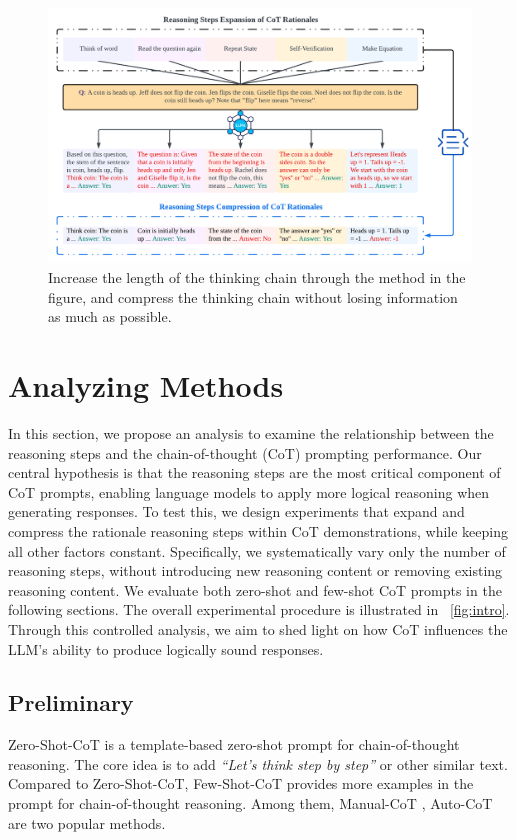 \documentclass[11pt]{article}
\begin{document}
\begin{figure}[ht]
    \centering
    \includegraphics[width=1\linewidth]{intro.pdf}
    \caption{Increase the length of the thinking chain through the method in the figure, and compress the thinking chain without losing information as much as possible.}
    \label{fig:intro}
\end{figure}


\section{Analyzing Methods}\label{sec:methods}
In this section, we propose an analysis to examine the relationship between the reasoning steps and the chain-of-thought (CoT) prompting performance. Our central hypothesis is that the reasoning steps are the most critical component of CoT prompts, enabling language models to apply more logical reasoning when generating responses.
To test this, we design experiments that expand and compress the rationale reasoning steps within CoT demonstrations, while keeping all other factors constant. Specifically, we systematically vary only the number of reasoning steps, without introducing new reasoning content or removing existing reasoning content. We evaluate both zero-shot and few-shot CoT prompts in the following sections. The overall experimental procedure is illustrated in ~\autoref{fig:intro}. Through this controlled analysis, we aim to shed light on how CoT influences the LLM's ability to produce logically sound responses. 

\subsection{Preliminary}
Zero-Shot-CoT \cite{kojima2023large} is a template-based zero-shot prompt for chain-of-thought reasoning. The core idea is to add \textit{``Let's think step by step''} or other similar text. Compared to Zero-Shot-CoT, Few-Shot-CoT provides more examples in the prompt for chain-of-thought reasoning. Among them, Manual-CoT \cite{wei2022chain}, Auto-CoT \cite{zhang2022automatic} are two popular methods.
\end{document}
